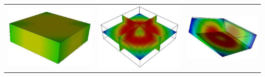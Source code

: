 \begin{table}[ht]
\begin{tabular}{c c c}
\includegraphics[width=\thumbnailwidth]{figures/Map} &
\includegraphics[width=\thumbnailwidth]{figures/MapOnPlaneCut} &
\includegraphics[width=\thumbnailwidth]{figures/MapOnPlaneClip} \\

\end{tabular}
\end{table}
